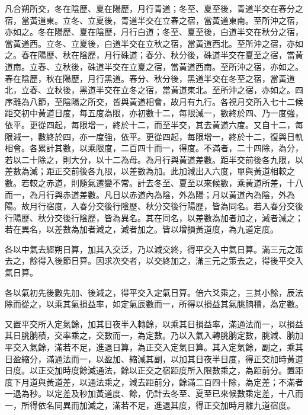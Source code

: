 \begin{pinyinscope}
 凡合朔所交，冬在陰歷、夏在陽歷，月行青道；冬至、夏至後，青道半交在春分之宿，當黃道東。立冬、立夏後，青道半交在立春之宿，當黃道東南。至所沖之宿，亦如之。冬在陽歷、夏在陰歷，月行白道；冬至、夏至後，白道半交在秋分之宿，當黃道西。立冬、立夏後，白道半交在立秋之宿，當黃道西北。至所沖之宿，亦如之。春在陽歷、秋在陰歷，月行硃道；春分、秋分後，硃道半交在夏至之宿，當黃道南。立春、立秋後，硃道半交在立夏之宿，當黃道西南。至所沖之宿，亦如之。春在陰歷，秋在陽歷，月行黑道。春分、秋分後，黑道半交在冬至之宿，當黃道北，立春、立秋後，黑道半交在立冬之宿，當黃道東北。至所沖之宿，亦如之。四序離為八節，至陰陽之所交，皆與黃道相會，故月有九行。各視月交所入七十二候距交初中黃道日度，每五度為限，亦初數十二，每限減一，數終於四、乃一度強，依平。更從四起，每限增一，終於十二，而至半交，其去黃道六度。又自十二，每限減一，數終於四，亦一度強，依平。更從四起，每限增一，終於十二，復與日軌相會。各累計其數，以乘限度，二百四十而一，得度。不滿者，二十四除，為分，若以二十除之，則大分，以十二為母。為月行與黃道差數。距半交前後各九限，以差數為減；距正交前後各九限，以差數為加。此加減出入六度，單與黃道相較之數。若較之赤道，則隨氣遷變不常。計去冬至、夏至以來候數，乘黃道所差，十八而一，為月行與赤道差數。凡日以赤道內為陰，外為陽；月以黃道內為陰，外為陽。故月行宿度，入春分交後行陰歷、秋分交後行陽歷，皆為同名。若入春分交後行陽歷、秋分交後行陰歷，皆為異名。其在同名，以差數為加者加之，減者減之；若在異名，以差數為加者減之，減者加之。皆以增損黃道度，為九道定度。



 各以中氣去經朔日算，加其入交泛，乃以減交終，得平交入中氣日算。滿三元之策去之，餘得入後節日算。因求次交者，以交終加之，滿三元之策去之，得後平交入氣日算。



 各以氣初先後數先加、後減之，得平交入定氣日算。倍六爻乘之，三其小餘，辰法除而從之，以乘其氣損益率，如定氣辰數而一，所得以損益其氣朓朒積，為定數。



 又置平交所入定氣餘，加其日夜半入轉餘，以乘其日損益率，滿通法而一，以損益其日朓朒積，交率乘之，交數而一，為定數。乃以入氣入轉朓朒定數，朓減、朒加平交入氣餘，滿若不足，進退日算，為正交入定氣日算。其入定氣餘，副之，乘其日盈縮分，滿通法而一，以盈加、縮減其副，以加其日夜半日度，得正交加時黃道日度。以正交加時度餘減通法，餘以正交之宿距度所入限數乘之，為距前分。置距度下月道與黃道差，以通法乘之，減去距前分，餘滿二百四十除，為定差；不滿者一退為秒。以定差及秒加黃道度、餘，仍計去冬至、夏至已來候數乘定差，十八而一，所得依名同異而加減之，滿若不足，進退其度，得正交加時月離九道宿度。




\end{pinyinscope}

